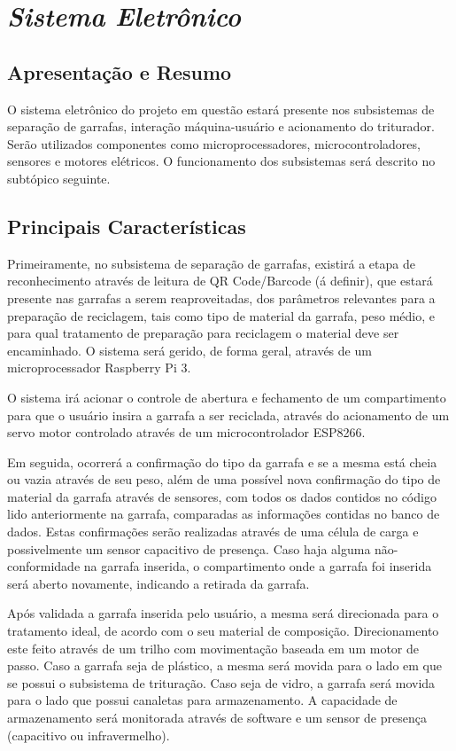 \section{\textit{Sistema Eletrônico}}

\subsection{Apresentação e Resumo}

    O sistema eletrônico do projeto em questão estará presente nos subsistemas de separação de garrafas, interação máquina-usuário e acionamento do triturador. Serão utilizados componentes como microprocessadores, microcontroladores, sensores e motores elétricos. O funcionamento dos subsistemas será descrito no subtópico seguinte.

\subsection{Principais Características}

    Primeiramente, no subsistema de separação de garrafas, existirá a etapa de reconhecimento através de leitura de QR Code/Barcode (á definir), que estará presente nas garrafas a serem reaproveitadas, dos parâmetros relevantes para a preparação de reciclagem, tais como tipo de material da garrafa, peso médio, e para qual tratamento de preparação para reciclagem o material deve ser encaminhado. O sistema será gerido, de forma geral, através de um microprocessador Raspberry Pi 3.

    O sistema irá acionar o controle de abertura e fechamento de um compartimento para que o usuário insira a garrafa a ser reciclada, através do acionamento de um servo motor controlado através de um microcontrolador ESP8266.

    Em seguida, ocorrerá a confirmação do tipo da garrafa e se a mesma está cheia ou vazia através de seu peso, além de uma possível nova confirmação do tipo de material da garrafa através de sensores, com todos os dados contidos no código lido anteriormente na garrafa, comparadas as informações contidas no banco de dados.  Estas confirmações serão realizadas através de uma célula de carga e possivelmente um sensor capacitivo de presença. Caso haja alguma não-conformidade na garrafa inserida, o compartimento onde a garrafa foi inserida será aberto novamente, indicando a retirada da garrafa.

    Após validada a garrafa inserida pelo usuário, a mesma será direcionada para o tratamento ideal, de acordo com o seu material de composição. Direcionamento este feito através de um trilho com movimentação baseada em um motor de passo. Caso a garrafa seja de plástico, a mesma será movida para o lado em que se possui o subsistema de trituração. Caso seja de vidro, a garrafa será movida para o lado que possui canaletas para armazenamento.  A capacidade de armazenamento será monitorada através de software e um sensor de presença (capacitivo ou infravermelho).


